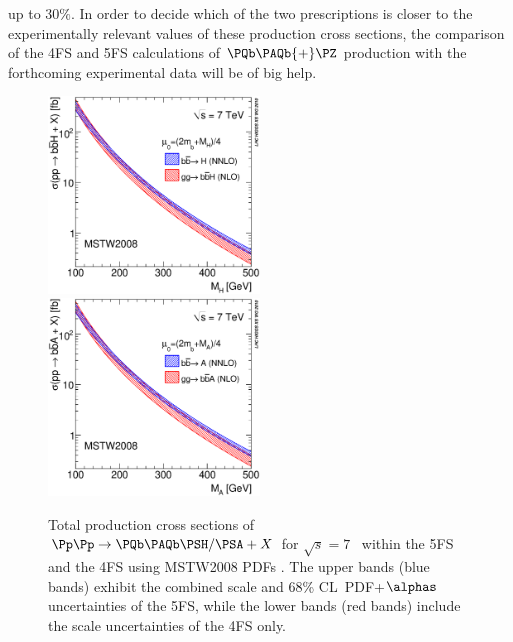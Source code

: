 up to $30\%$. In order to decide which of the two prescriptions is closer
to the experimentally relevant values of these production cross
sections, the comparison of the 4FS and 5FS calculations of $\PQb\PAQb{+}\PZ$
production with the forthcoming experimental data will be of big help.
\begin{figure}[htb]
\includegraphics[width=0.5\textwidth]{YRHXS_MSSM_neutral/YRHXS_MSSM_neutral_fig5a.eps}
\includegraphics[width=0.5\textwidth]{YRHXS_MSSM_neutral/YRHXS_MSSM_neutral_fig5b.eps}
\caption{\label{YRHXS_MSSM_neutral_fig5} Total production cross
sections of $\Pp\Pp\to \PQb\PAQb\PSH/\PSA+X$ for $\sqrt{s}=7$
\UTeV~within the 5FS and the 4FS using MSTW2008 PDFs
\cite{Martin:2009iq,Martin:2009bu}. The upper bands (blue bands) exhibit the combined
scale and 68\% CL~PDF+$\alphas$ uncertainties of the 5FS, while the
lower bands (red
bands) include the scale uncertainties of the 4FS only.} \end{figure}

